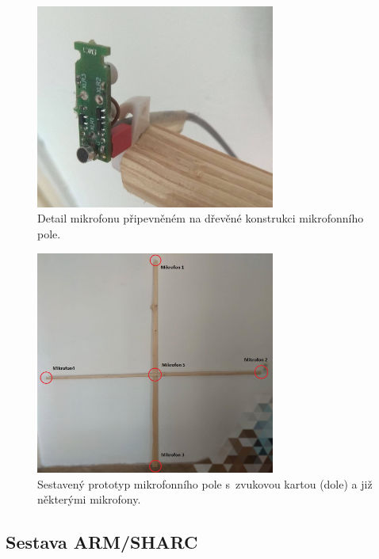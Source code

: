 \begin{figure}[!hbt]
	\centering
	\includegraphics[width=0.7\textwidth]{obrazky-figures/mikrofon_detail.jpg}
	\caption{Detail mikrofonu připevněném na dřevěné konstrukci mikrofonního pole.}
	\label{pic:detail_uchyceni}
\end{figure}

\begin{figure}[!hbt]
	\centering
	\includegraphics[width=0.7\textwidth]{obrazky-figures/kriz_cely.jpg}
	\caption{Sestavený prototyp mikrofonního pole s~zvukovou kartou (dole) a již některými mikrofony.}
	\label{pic:fotka_krize}
\end{figure}
\newpage
\subsection{Sestava ARM/SHARC}


